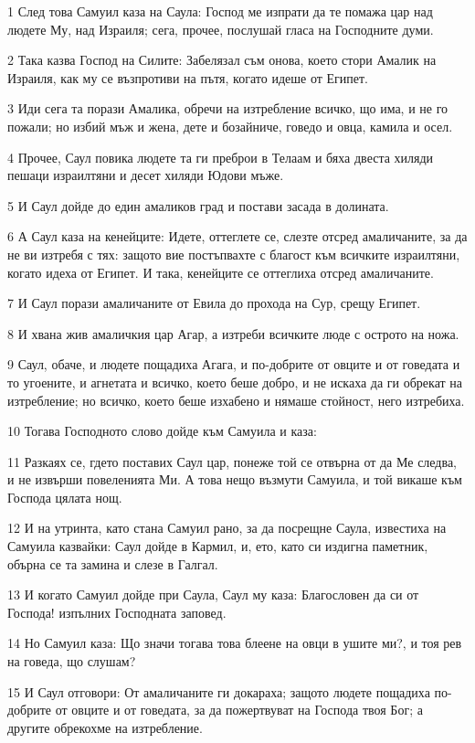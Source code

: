 \par 1 След това Самуил каза на Саула: Господ ме изпрати да те помажа цар над людете Му, над Израиля; сега, прочее, послушай гласа на Господните думи.
\par 2 Така казва Господ на Силите: Забелязал съм онова, което стори Амалик на Израиля, как му се възпротиви на пътя, когато идеше от Египет.
\par 3 Иди сега та порази Амалика, обречи на изтребление всичко, що има, и не го пожали; но избий мъж и жена, дете и бозайниче, говедо и овца, камила и осел.
\par 4 Прочее, Саул повика людете та ги преброи в Телаам и бяха двеста хиляди пешаци израилтяни и десет хиляди Юдови мъже.
\par 5 И Саул дойде до един амаликов град и постави засада в долината.
\par 6 А Саул каза на кенейците: Идете, оттеглете се, слезте отсред амаличаните, за да не ви изтребя с тях: защото вие постъпвахте с благост към всичките израилтяни, когато идеха от Египет. И така, кенейците се оттеглиха отсред амаличаните.
\par 7 И Саул порази амаличаните от Евила до прохода на Сур, срещу Египет.
\par 8 И хвана жив амаличкия цар Агар, а изтреби всичките люде с острото на ножа.
\par 9 Саул, обаче, и людете пощадиха Агага, и по-добрите от овците и от говедата и то угоените, и агнетата и всичко, което беше добро, и не искаха да ги обрекат на изтребление; но всичко, което беше изхабено и нямаше стойност, него изтребиха.
\par 10 Тогава Господното слово дойде към Самуила и каза:
\par 11 Разкаях се, гдето поставих Саул цар, понеже той се отвърна от да Ме следва, и не извърши повеленията Ми. А това нещо възмути Самуила, и той викаше към Господа цялата нощ.
\par 12 И на утринта, като стана Самуил рано, за да посрещне Саула, известиха на Самуила казвайки: Саул дойде в Кармил, и, ето, като си издигна паметник, обърна се та замина и слезе в Галгал.
\par 13 И когато Самуил дойде при Саула, Саул му каза: Благословен да си от Господа! изпълних Господната заповед.
\par 14 Но Самуил каза: Що значи тогава това блеене на овци в ушите ми?, и тоя рев на говеда, що слушам?
\par 15 И Саул отговори: От амаличаните ги докараха; защото людете пощадиха по-добрите от овците и от говедата, за да пожертвуват на Господа твоя Бог; а другите обрекохме на изтребление.
